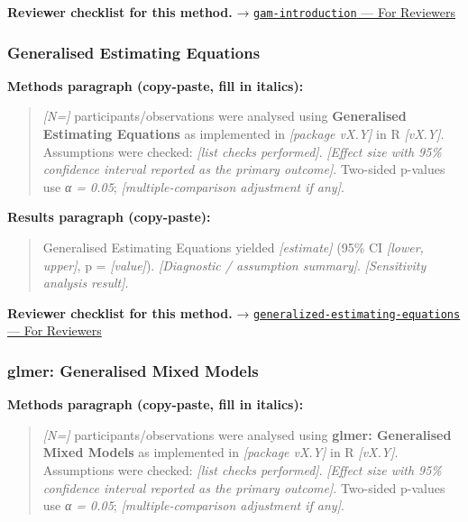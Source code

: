 \documentclass[
]{article}
\begin{document}
\textbf{Reviewer checklist for this method.} →
\href{../chapters/07-regression/gam-introduction.Rmd\#for-reviewers}{\texttt{gam-introduction}
--- For Reviewers}

\subsubsection{Generalised Estimating
Equations}\label{generalised-estimating-equations}

\textbf{Methods paragraph (copy-paste, fill in italics):}

\begin{quote}
\emph{{[}N={]}} participants/observations were analysed using
\textbf{Generalised Estimating Equations} as implemented in
\emph{{[}package vX.Y{]}} in R \emph{{[}vX.Y{]}}. Assumptions were
checked: \emph{{[}list checks performed{]}}. \emph{{[}Effect size with
95\% confidence interval reported as the primary outcome{]}}. Two-sided
p-values use \emph{α = 0.05}; \emph{{[}multiple-comparison adjustment if
any{]}}.
\end{quote}

\textbf{Results paragraph (copy-paste):}

\begin{quote}
Generalised Estimating Equations yielded \emph{{[}estimate{]}} (95\% CI
\emph{{[}lower, upper{]}}, p = \emph{{[}value{]}}). \emph{{[}Diagnostic
/ assumption summary{]}}. \emph{{[}Sensitivity analysis result{]}}.
\end{quote}

\textbf{Reviewer checklist for this method.} →
\href{../chapters/07-regression/generalized-estimating-equations.Rmd\#for-reviewers}{\texttt{generalized-estimating-equations}
--- For Reviewers}

\subsubsection{glmer: Generalised Mixed
Models}\label{glmer-generalised-mixed-models}

\textbf{Methods paragraph (copy-paste, fill in italics):}

\begin{quote}
\emph{{[}N={]}} participants/observations were analysed using
\textbf{glmer: Generalised Mixed Models} as implemented in
\emph{{[}package vX.Y{]}} in R \emph{{[}vX.Y{]}}. Assumptions were
checked: \emph{{[}list checks performed{]}}. \emph{{[}Effect size with
95\% confidence interval reported as the primary outcome{]}}. Two-sided
p-values use \emph{α = 0.05}; \emph{{[}multiple-comparison adjustment if
any{]}}.
\end{quote}
\end{document}
